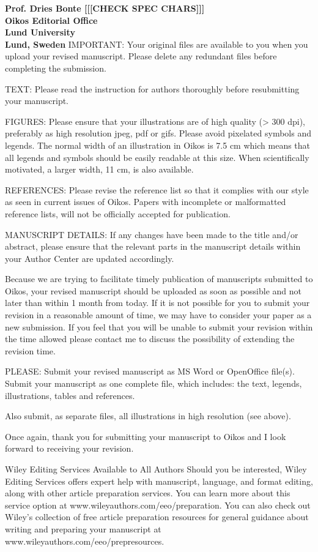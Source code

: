 \documentclass[12pt]{letter}
\begin{document}
\begin{letter}{\bf Prof. Dries Bonte [[[CHECK SPEC CHARS]]]\\
Oikos Editorial Office \\
Lund University \\
Lund, Sweden}
IMPORTANT:  Your original files are available to you when you upload your revised manuscript.  Please delete any redundant files before completing the submission.

TEXT: Please read the instruction for authors thoroughly before resubmitting your manuscript.

FIGURES: Please ensure that your illustrations are of high quality (> 300 dpi), preferably as high resolution jpeg, pdf or gifs. Please avoid pixelated symbols and legends. The normal width of an illustration in Oikos is 7.5 cm which means that all legends and symbols should be easily readable at this size. When scientifically motivated, a larger width, 11 cm, is also available.

REFERENCES: Please revise the reference list so that it complies with our style as seen in current issues of Oikos.  Papers with incomplete or malformatted reference lists, will not be officially accepted for publication.

MANUSCRIPT DETAILS: If any changes have been made to the title and/or abstract, please ensure that the relevant parts in the manuscript details within your Author Center are updated accordingly.

Because we are trying to facilitate timely publication of manuscripts submitted to Oikos, your revised manuscript should be uploaded as soon as possible and not later than within 1 month from today.  If it is not possible for you to submit your revision in a reasonable amount of time, we may have to consider your paper as a new submission.  If you feel that you will be unable to submit your revision within the time allowed please contact me to discuss the possibility of extending the revision time.

PLEASE: Submit your revised manuscript as MS Word or OpenOffice file(s). Submit your manuscript as one complete file, which includes: the text, legends, illustrations, tables and references.

Also submit, as separate files, all illustrations in high resolution (see above).

Once again, thank you for submitting your manuscript to Oikos and I look forward to receiving your revision.

Wiley Editing Services Available to All Authors
Should you be interested, Wiley Editing Services offers expert help with manuscript, language, and format editing, along with other article preparation services. You can learn more about this service option at www.wileyauthors.com/eeo/preparation. You can also check out Wiley’s collection of free article preparation resources for general guidance about writing and preparing your manuscript at www.wileyauthors.com/eeo/prepresources.


\end{letter}
\end{document}
